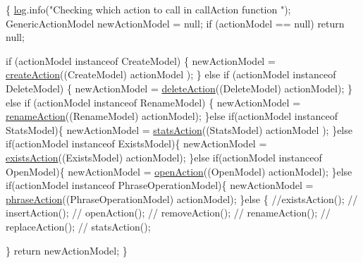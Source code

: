 \begin{DoxyCode}
                                                                               
       \{
        \hyperlink{classcom_1_1poly_1_1nlp_1_1filekommander_1_1file_1_1actions_1_1_call_action_a65b722d9482bd93c3ae2b31f51050a08}{log}.info(\textcolor{stringliteral}{"Checking which action to call in callAction function "});
        GenericActionModel newActionModel = null;
        \textcolor{keywordflow}{if} (actionModel == null)
            \textcolor{keywordflow}{return} null;

        \textcolor{keywordflow}{if} (actionModel instanceof CreateModel) \{
            newActionModel = \hyperlink{classcom_1_1poly_1_1nlp_1_1filekommander_1_1file_1_1actions_1_1_call_action_a9732d3e6e92378607607b7bd0bb91736}{createAction}((CreateModel) actionModel
      );
        \} \textcolor{keywordflow}{else} \textcolor{keywordflow}{if} (actionModel instanceof DeleteModel) \{
            newActionModel =    \hyperlink{classcom_1_1poly_1_1nlp_1_1filekommander_1_1file_1_1actions_1_1_call_action_ae2b04b022b8ec6d18419cc14d747972c}{deleteAction}((DeleteModel) 
      actionModel);
        \}  \textcolor{keywordflow}{else} \textcolor{keywordflow}{if} (actionModel instanceof RenameModel) \{
            newActionModel =    \hyperlink{classcom_1_1poly_1_1nlp_1_1filekommander_1_1file_1_1actions_1_1_call_action_a11aae4f7ed1d404e8cd63c48ce91f427}{renameAction}((RenameModel) 
      actionModel);
        \}\textcolor{keywordflow}{else} \textcolor{keywordflow}{if}(actionModel instanceof StatsModel)\{
            newActionModel =    \hyperlink{classcom_1_1poly_1_1nlp_1_1filekommander_1_1file_1_1actions_1_1_call_action_a2668fbc0bf50bdf3b09853f2d88d8a9d}{statsAction}((StatsModel) actionModel
      );
        \}\textcolor{keywordflow}{else} \textcolor{keywordflow}{if}(actionModel instanceof ExistsModel)\{
            newActionModel =    \hyperlink{classcom_1_1poly_1_1nlp_1_1filekommander_1_1file_1_1actions_1_1_call_action_ac68ec1fe48c2f90ab839762fa379cf89}{existsAction}((ExistsModel) 
      actionModel);
        \}\textcolor{keywordflow}{else} \textcolor{keywordflow}{if}(actionModel instanceof OpenModel)\{
            newActionModel =    \hyperlink{classcom_1_1poly_1_1nlp_1_1filekommander_1_1file_1_1actions_1_1_call_action_a7fb9cae998e1f8596e02046de58fd1c6}{openAction}((OpenModel) actionModel);
        \}\textcolor{keywordflow}{else} \textcolor{keywordflow}{if}(actionModel instanceof PhraseOperationModel)\{
            newActionModel =    \hyperlink{classcom_1_1poly_1_1nlp_1_1filekommander_1_1file_1_1actions_1_1_call_action_af69262a5d997b87d5996f9818f13cf13}{phraseAction}((PhraseOperationModel)
       actionModel);
        \}\textcolor{keywordflow}{else} \{
            \textcolor{comment}{//existsAction();}
    \textcolor{comment}{//      insertAction();}
        \textcolor{comment}{//  openAction();}
        \textcolor{comment}{//  removeAction();}
        \textcolor{comment}{// renameAction();}
        \textcolor{comment}{//  replaceAction();}
        \textcolor{comment}{//  statsAction();}

        \}
        \textcolor{keywordflow}{return} newActionModel;
    \}
\end{DoxyCode}

